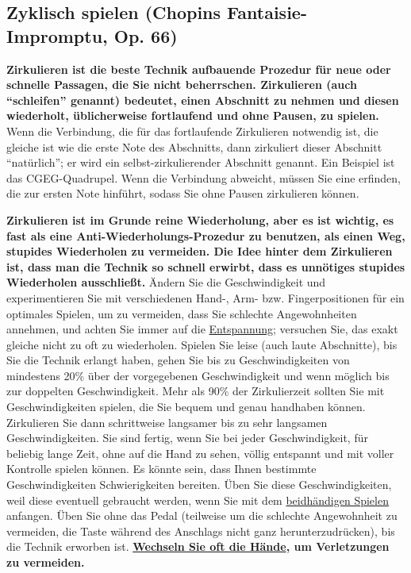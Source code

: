 
\subsection{Zyklisch spielen (Chopins Fantaisie-Impromptu, Op. 66)}
\label{c1iii2}

\textbf{Zirkulieren ist die beste Technik aufbauende Prozedur für neue oder schnelle Passagen, die Sie nicht beherrschen.
Zirkulieren (auch \enquote{schleifen} genannt) bedeutet, einen Abschnitt zu nehmen und diesen wiederholt, üblicherweise fortlaufend und ohne Pausen, zu spielen.}
Wenn die Verbindung, die für das fortlaufende Zirkulieren notwendig ist, die gleiche ist wie die erste Note des Abschnitts, dann zirkuliert dieser Abschnitt \enquote{natürlich}; er wird ein selbst-zirkulierender Abschnitt genannt.
Ein Beispiel ist das CGEG-Quadrupel.
Wenn die Verbindung abweicht, müssen Sie eine erfinden, die zur ersten Note hinführt, sodass Sie ohne Pausen zirkulieren können.

\textbf{Zirkulieren ist im Grunde reine Wiederholung, aber es ist wichtig, es fast als eine Anti-Wiederholungs-Prozedur zu benutzen, als einen Weg, stupides Wiederholen zu vermeiden.
Die Idee hinter dem Zirkulieren ist, dass man die Technik so schnell erwirbt, dass es unnötiges stupides Wiederholen ausschließt.}
Ändern Sie die Geschwindigkeit und experimentieren Sie mit verschiedenen Hand-, Arm- bzw. Fingerpositionen für ein optimales Spielen, um zu vermeiden, dass Sie schlechte Angewohnheiten annehmen, und achten Sie immer auf die \hyperref[c1ii14]{Entspannung}; versuchen Sie, das exakt gleiche nicht zu oft zu wiederholen.
Spielen Sie leise (auch laute Abschnitte), bis Sie die Technik erlangt haben, gehen Sie bis zu Geschwindigkeiten von mindestens 20\% über der vorgegebenen Geschwindigkeit und wenn möglich bis zur doppelten Geschwindigkeit.
Mehr als 90\% der Zirkulierzeit sollten Sie mit Geschwindigkeiten spielen, die Sie bequem und genau handhaben können.
Zirkulieren Sie dann schrittweise langsamer bis zu sehr langsamen Geschwindigkeiten.
Sie sind fertig, wenn Sie bei jeder Geschwindigkeit, für beliebig lange Zeit, ohne auf die Hand zu sehen, völlig entspannt und mit voller Kontrolle spielen können.
Es könnte sein, dass Ihnen bestimmte Geschwindigkeiten Schwierigkeiten bereiten.
Üben Sie diese Geschwindigkeiten, weil diese eventuell gebraucht werden, wenn Sie mit dem \hyperref[c1ii25]{beidhändigen Spielen} anfangen.
Üben Sie ohne das Pedal (teilweise um die schlechte Angewohnheit zu vermeiden, die Taste während des Anschlags nicht ganz herunterzudrücken), bis die Technik erworben ist.
\textbf{\hyperref[c1ii7]{Wechseln Sie oft die Hände}, um Verletzungen zu vermeiden.}

